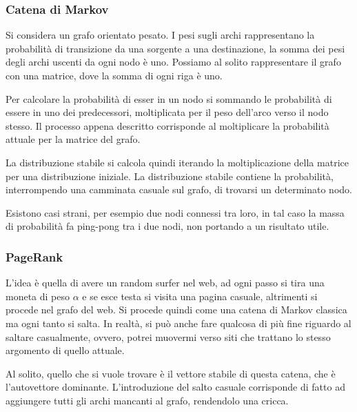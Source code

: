 \subsubsection{Catena di Markov}
Si considera un grafo orientato pesato. I pesi sugli archi rappresentano la probabilità 
di transizione da una sorgente a una destinazione, la somma dei pesi degli archi 
uscenti da ogni nodo è uno.
Possiamo al solito rappresentare il grafo con una matrice, dove la somma di ogni riga 
è uno.

Per calcolare la probabilità di esser in un nodo si sommando le probabilità di 
essere in uno dei predecessori, moltiplicata per il peso dell'arco verso il nodo stesso.
Il processo appena descritto corrisponde al moltiplicare la probabilità attuale 
per la matrice del grafo.

La distribuzione stabile si calcola quindi iterando la moltiplicazione della matrice 
per una distribuzione iniziale. La distribuzione stabile contiene
la probabilità, interrompendo una camminata casuale sul grafo, di trovarsi un determinato 
nodo. 

Esistono casi strani, per esempio due nodi connessi tra loro, in tal caso 
la massa di probabilità fa ping-pong tra i due nodi, non portando a un risultato 
utile.

\subsubsection{PageRank}
L'idea è quella di avere un random surfer nel web, ad ogni passo si tira una 
moneta di peso $\alpha$ e se esce testa si visita una pagina casuale, 
altrimenti si procede nel grafo del web.
Si procede quindi come una catena di Markov classica ma ogni tanto si salta.
In realtà, si può anche fare qualcosa di più fine riguardo al saltare casualmente, 
ovvero, potrei muovermi verso siti che trattano lo stesso argomento di quello
attuale.

Al solito, quello che si vuole trovare è il vettore stabile di questa catena, 
che è l'autovettore dominante.
L'introduzione del salto casuale corrisponde di fatto ad aggiungere tutti gli archi 
mancanti al grafo, rendendolo una cricca.
